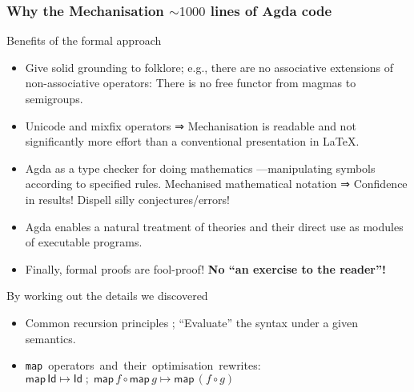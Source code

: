 \documentclass[serif,mathserif,10pt]{beamer}
\def\Id{\mathsf{Id}}
\begin{document}
\begin{frame} \frametitle{Why the Mechanisation \hfill
    {\footnotesize $\sim1000$ lines of Agda code}}

{\footnotesize

  \pause
  \vspace{-1em}
  \begin{block}{Benefits of the formal approach}
    \begin{itemize} \itemsep0em      
    \item Give solid grounding to folklore; e.g., there are no associative
      extensions of non-associative operators: There is no free functor from magmas to semigroups.

    \pause
    \item Unicode and mixfix operators ⇒ Mechanisation is readable and not significantly more effort than a conventional presentation in LaTeX.

    \pause
    \item Agda as a type checker for doing mathematics —manipulating symbols according to specified rules. Mechanised mathematical notation ⇒ \alert{Confidence in results!} Dispell silly conjectures/errors!

    \pause      
    \item Agda enables a natural treatment of theories and their direct use as modules of executable programs.

    \pause      
    \item Finally, formal proofs are fool-proof! \textbf{No “an exercise to the reader”!}      
    \end{itemize}
  \end{block}
  
  \pause
  \vspace{-0.8em}
  \def\map{\mathsf{map}\,}  
  \begin{block}{By working out the details we \alert{discovered} }
    \begin{itemize} \itemsep0em
    \item Common recursion principles %
      ; “Evaluate” the \alert{syntax} under a given \alert{semantics}.

    \pause      
    \item \texttt{map}~operators~and~their~optimisation~rewrites:~$\map \Id \mapsto \Id \; ; \; \map f \circ \map g \mapsto \map (f ∘ g)$


\end{itemize}
\end{block}}
\end{frame}
\end{document}

